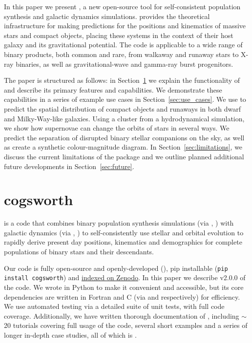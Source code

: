 \documentclass[twocolumn, twocolappendix, oneside, linenumbers]{aastex631}
\begin{document}
In this paper we present \cogsworth, a new open-source tool for self-consistent population synthesis and galactic dynamics simulations. \cogsworth provides the theoretical infrastructure for making predictions for the positions and kinematics of massive stars and compact objects, placing these systems in the context of their host galaxy and its gravitational potential. The code is applicable to a wide range of binary products, both common and rare, from walkaway and runaway stars to X-ray binaries, as well as gravitational-wave and gamma-ray burst progenitors.

The paper is structured as follows: in Section~\ref{sec:cogsworth} we explain the functionality of \cogsworth and describe its primary features and capabilities. We demonstrate these capabilities in a series of example use cases in Section~\ref{sec:use_cases}. We use \cogsworth to predict the spatial distribution of compact objects and runaways in both dwarf and Milky-Way-like galaxies. Using a cluster from a hydrodynamical simulation, we show how supernovae can change the orbits of stars in several ways. We predict the separation of disrupted binary stellar companions on the sky, as well as create a synthetic \gaia colour-magnitude diagram. In Section~\ref{sec:limitations}, we discuss the current limitations of the package and we outline planned additional future developments in Section~\ref{sec:future}.

\section{cogsworth}\label{sec:cogsworth}

\cogsworth is a code that combines binary population synthesis simulations (via \cosmic, \citealp{COSMIC}) with galactic dynamics (via \gala, \citealp{Gala}) to self-consistently use stellar and orbital evolution to rapidly derive present day positions, kinematics and demographics for complete populations of binary stars and their descendants. 

Our code is fully open-source and openly-developed (), pip installable (\texttt{pip install cogsworth}) and \href{https://zenodo.org/records/13709381}{indexed on Zenodo}. In this paper we describe v2.0.0 of the code. We wrote \cogsworth in Python to make it convenient and accessible, but its core dependencies are written in Fortran and C (via \cosmic and \gala respectively) for efficiency. We use automated testing via a detailed suite of unit tests, with full code coverage. Additionally, we have written thorough documentation of \cogsworth, including $\sim$20 tutorials covering full usage of the code, several short examples and a series of longer in-depth case studies, all of which is .
\end{document}
